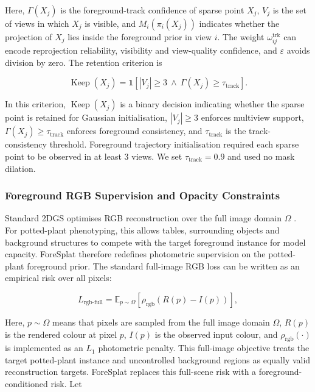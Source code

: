 \documentclass[a4paper]{cas-sc}
\begin{document}
Here, \(\Gamma(X_j)\) is the foreground-track confidence of sparse point \(X_j\), \(V_j\) is the set of views in which \(X_j\) is visible, and \(M_i(\pi_i(X_j))\) indicates whether the projection of \(X_j\) lies inside the foreground prior in view \(i\). The weight \(\omega_{ij}^{\text{trk}}\) can encode reprojection reliability, visibility and view-quality confidence, and \(\varepsilon\) avoids division by zero. The retention criterion is

\[
\operatorname{Keep}(X_j)=\mathbf{1}\left[
|V_j|\geq 3\ \land\ \Gamma(X_j)\geq \tau_{\text{track}}
\right].
\]

In this criterion, \(\operatorname{Keep}(X_j)\) is a binary decision indicating whether the sparse point is retained for Gaussian initialisation, \(|V_j|\geq 3\) enforces multiview support, \(\Gamma(X_j)\geq\tau_{\text{track}}\) enforces foreground consistency, and \(\tau_{\text{track}}\) is the track-consistency threshold. Foreground trajectory initialisation required each sparse point to be observed in at least 3 views. We set \(\tau_{\text{track}}=0.9\) and used no mask dilation.

\subsubsection{Foreground RGB Supervision and Opacity Constraints}\label{sec:foreground-rgb-supervision-and-opacity-c}

Standard 2DGS optimises RGB reconstruction over the full image domain \(\Omega\) \cite{ref28}. For potted-plant phenotyping, this allows tables, surrounding objects and background structures to compete with the target foreground instance for model capacity. ForeSplat therefore redefines photometric supervision on the potted-plant foreground prior. The standard full-image RGB loss can be written as an empirical risk over all pixels:

\[
L_{\text{rgb-full}}=
\mathbb{E}_{p\sim\Omega}\left[\rho_{\text{rgb}}\left(R(p)-I(p)\right)\right],
\]

Here, \(p\sim\Omega\) means that pixels are sampled from the full image domain \(\Omega\), \(R(p)\) is the rendered colour at pixel \(p\), \(I(p)\) is the observed input colour, and \(\rho_{\text{rgb}}(\cdot)\) is implemented as an \(L_1\) photometric penalty. This full-image objective treats the target potted-plant instance and uncontrolled background regions as equally valid reconstruction targets. ForeSplat replaces this full-scene risk with a foreground-conditioned risk. Let
\end{document}
